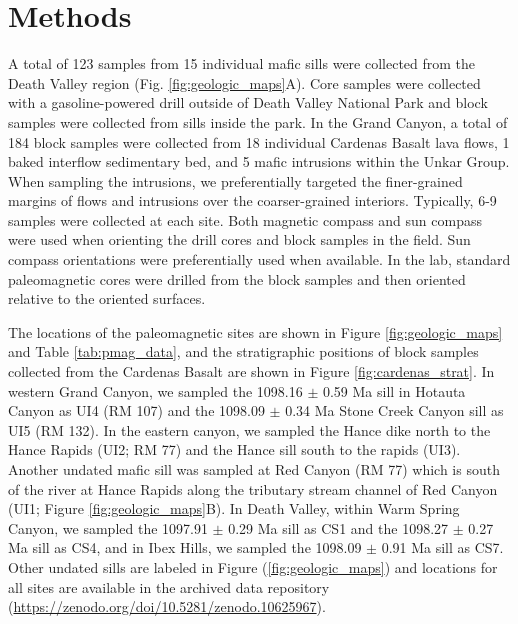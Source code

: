 \section*{Methods}

A total of 123 samples from 15 individual mafic sills were collected from the Death Valley region (Fig. \ref{fig:geologic_maps}A). Core samples were collected with a gasoline-powered drill outside of Death Valley National Park and block samples were collected from sills inside the park. In the Grand Canyon, a total of 184 block samples were collected from 18 individual Cardenas Basalt lava flows, 1 baked interflow sedimentary bed, and 5 mafic intrusions within the Unkar Group. When sampling the intrusions, we preferentially targeted the finer-grained margins of flows and intrusions over the coarser-grained interiors. Typically, 6-9 samples were collected at each site. Both magnetic compass and sun compass were used when orienting the drill cores and block samples in the field. Sun compass orientations were preferentially used when available. In the lab, standard paleomagnetic cores were drilled from the block samples and then oriented relative to the oriented surfaces.

The locations of the paleomagnetic sites are shown in Figure \ref{fig:geologic_maps} and Table \ref{tab:pmag_data}, and the stratigraphic positions of block samples collected from the Cardenas Basalt are shown in Figure \ref{fig:cardenas_strat}. In western Grand Canyon, we sampled the 1098.16 $\pm$ 0.59 Ma sill in Hotauta Canyon as UI4 (RM 107) and the 1098.09 $\pm$ 0.34 Ma Stone Creek Canyon sill as UI5 (RM 132). In the eastern canyon, we sampled the Hance dike north to the Hance Rapids (UI2; RM 77) and the Hance sill south to the rapids (UI3). Another undated mafic sill was sampled at Red Canyon (RM 77) which is south of the river at Hance Rapids along the tributary stream channel of Red Canyon (UI1; Figure \ref{fig:geologic_maps}B). In Death Valley, within Warm Spring Canyon, we sampled the 1097.91 $\pm$ 0.29 Ma sill as CS1 and the 1098.27 $\pm$ 0.27 Ma sill as CS4, and in Ibex Hills, we sampled the 1098.09 $\pm$ 0.91 Ma sill as CS7. Other undated sills are labeled in Figure (\ref{fig:geologic_maps}) and locations for all sites are available in the archived data repository (\url{https://zenodo.org/doi/10.5281/zenodo.10625967}). 

